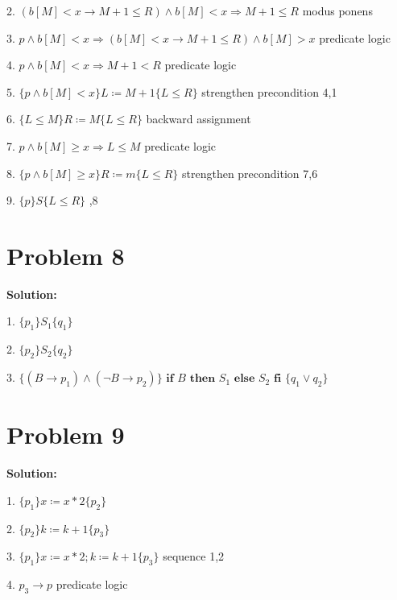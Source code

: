 \documentclass{article}
\begin{document}
2. $ (b[M]<x \rightarrow M+1 \leq R) \wedge b[M]<x \Rightarrow M+1 \leq R$  \qquad \qquad modus ponens

3. $ p \wedge b[M]<x \Rightarrow (b[M]<x \rightarrow M+1 \leq R) \wedge b[M] >x $  \qquad \qquad predicate logic

4. $ p \wedge b[M]<x \Rightarrow M+1<R $  \qquad \qquad \qquad \qquad \qquad \qquad \qquad \qquad predicate logic

5. $ \{p \wedge b[M]<x\} L \coloneqq M+1 \{L \leq R\} $  \qquad \qquad \qquad \qquad \qquad \qquad strengthen precondition 4,1

6. $ \{L \leq M\} R \coloneqq M \{L \leq R\} $ \qquad \qquad \qquad \qquad \qquad \qquad \qquad \qquad backward assignment

7. $ p \wedge b[M] \geq x \Rightarrow L \leq M $ \qquad \qquad \qquad \qquad \qquad \qquad \qquad \qquad \qquad predicate logic

8. $ \{p \wedge b[M] \geq x\} R \coloneqq m \{L \leq R\} $ \qquad \qquad \qquad \qquad \qquad \qquad \qquad strengthen precondition 7,6

9. $ \{p\}S\{L \leq R\} $ \qquad \qquad \qquad \qquad \qquad \qquad \qquad \qquad \qquad \qquad {},8

\section*{Problem 8}

\textbf{Solution: } 

1. $ \{p_1\}S_1 \{q_1\} $

2. $ \{p_2\}S_2 \{q_2\} $

3. $ \{(B \rightarrow p_1) \wedge (\lnot B \rightarrow p_2)\} \textbf{ if } B \textbf{ then } S_1 \textbf{ else } S_2 \textbf{ fi } \{q_1 \vee q_2\}$

\section*{Problem 9}

\textbf{Solution: } 

1. $ \{p_1\}x \coloneqq x*2 \{p_2\} $

2. $ \{p_2\}k \coloneqq k+1 \{p_3\} $

3. $ \{p_1\}x \coloneqq x*2;k \coloneqq k+1\{p_3\} $ \qquad \qquad \qquad \qquad \qquad \qquad \qquad sequence 1,2

4. $p_3 \rightarrow p $  \qquad \qquad \qquad \qquad \qquad \qquad \qquad \qquad \qquad \qquad \qquad \qquad predicate logic
\end{document}
